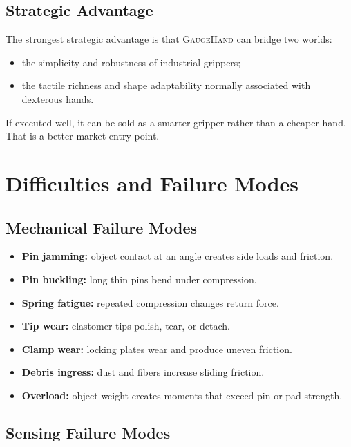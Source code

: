 \documentclass[11pt]{article}
\newcommand{\GaugeHand}{\textsc{GaugeHand}}
\begin{document}
\subsection{Strategic Advantage}

The strongest strategic advantage is that \GaugeHand{} can bridge two worlds:

\begin{itemize}[leftmargin=*]
  \item the simplicity and robustness of industrial grippers;
  \item the tactile richness and shape adaptability normally associated with dexterous hands.
\end{itemize}

If executed well, it can be sold as a smarter gripper rather than a cheaper hand. That is a better market entry point.

\section{Difficulties and Failure Modes}

\subsection{Mechanical Failure Modes}

\begin{itemize}[leftmargin=*]
  \item \textbf{Pin jamming:} object contact at an angle creates side loads and friction.
  \item \textbf{Pin buckling:} long thin pins bend under compression.
  \item \textbf{Spring fatigue:} repeated compression changes return force.
  \item \textbf{Tip wear:} elastomer tips polish, tear, or detach.
  \item \textbf{Clamp wear:} locking plates wear and produce uneven friction.
  \item \textbf{Debris ingress:} dust and fibers increase sliding friction.
  \item \textbf{Overload:} object weight creates moments that exceed pin or pad strength.
\end{itemize}

\subsection{Sensing Failure Modes}
\end{document}
